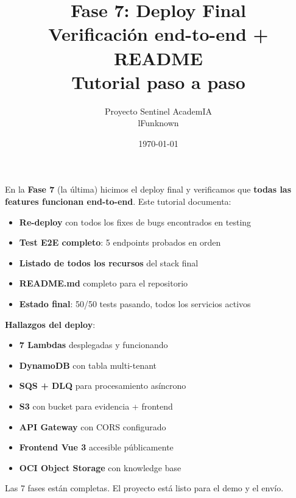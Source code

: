 \documentclass[11pt,a4paper,oneside]{article}
\title{\Huge\textbf{Fase 7: Deploy Final} \\[0.3em]
       \Large Verificaci\'on end-to-end + README \\[0.5em]
       \normalsize Tutorial paso a paso}
\author{Proyecto Sentinel AcademIA \\ \small lFunknown}
\date{\today}
\newcommand{\ok}{\textcolor{okgreen}{\textbf{\checkmark}}}
\begin{document}
\maketitle
\thispagestyle{empty}

\begin{tcolorbox}[colback=blue!5!white,colframe=infoblue,title={\textbf{¿Qué hicimos en este tutorial?}}]
En la \textbf{Fase 7} (la \'ultima) hicimos el deploy final y verificamos que \textbf{todas las features funcionan end-to-end}. Este tutorial documenta:

\begin{itemize}
  \item \textbf{Re-deploy} con todos los fixes de bugs encontrados en testing
  \item \textbf{Test E2E completo}: 5 endpoints probados en orden
  \item \textbf{Listado de todos los recursos} del stack final
  \item \textbf{README.md} completo para el repositorio
  \item \textbf{Estado final}: 50/50 tests pasando, todos los servicios activos
\end{itemize}

\textbf{Hallazgos del deploy}:
\begin{itemize}
  \item \ok \textbf{7 Lambdas} desplegadas y funcionando
  \item \ok \textbf{DynamoDB} con tabla multi-tenant
  \item \ok \textbf{SQS + DLQ} para procesamiento as\'incrono
  \item \ok \textbf{S3} con bucket para evidencia + frontend
  \item \ok \textbf{API Gateway} con CORS configurado
  \item \ok \textbf{Frontend Vue 3} accesible p\'ublicamente
  \item \ok \textbf{OCI Object Storage} con knowledge base
\end{itemize}
\end{tcolorbox}

\begin{tcolorbox}[colback=infoblue!5!white,colframe=infoblue,title={\textbf{Este es el tutorial final de la hackathon}}]
Las 7 fases est\'an completas. El proyecto est\'a listo para el demo y el env\'io.
\end{tcolorbox}

\tableofcontents
\newpage
\end{document}
